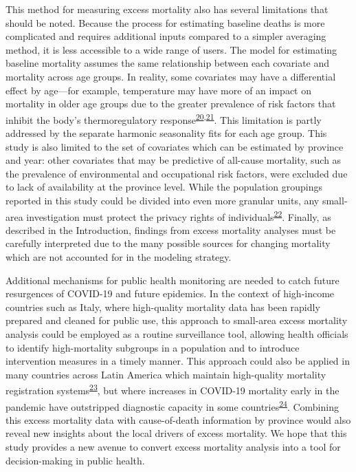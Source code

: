 \documentclass[
]{article}
\begin{document}
This method for measuring excess mortality also has several limitations that should be noted. Because the process for estimating baseline deaths is more complicated and requires additional inputs compared to a simpler averaging method, it is less accessible to a wide range of users. The model for estimating baseline mortality assumes the same relationship between each covariate and mortality across age groups. In reality, some covariates may have a differential effect by age---for example, temperature may have more of an impact on mortality in older age groups due to the greater prevalence of risk factors that inhibit the body's thermoregulatory response\textsuperscript{\protect\hyperlink{ref-Yu2010}{20},\protect\hyperlink{ref-Stafoggia2008}{21}}⁠. This limitation is partly addressed by the separate harmonic seasonality fits for each age group. This study is also limited to the set of covariates which can be estimated by province and year: other covariates that may be predictive of all-cause mortality, such as the prevalence of environmental and occupational risk factors, were excluded due to lack of availability at the province level. While the population groupings reported in this study could be divided into even more granular units, any small-area investigation must protect the privacy rights of individuals\textsuperscript{\protect\hyperlink{ref-Bayer2000}{22}}⁠. Finally, as described in the Introduction, findings from excess mortality analyses must be carefully interpreted due to the many possible sources for changing mortality which are not accounted for in the modeling strategy.

Additional mechanisms for public health monitoring are needed to catch future resurgences of COVID-19 and future epidemics. In the context of high-income countries such as Italy, where high-quality mortality data has been rapidly prepared and cleaned for public use, this approach to small-area excess mortality analysis could be employed as a routine surveillance tool, allowing health officials to identify high-mortality subgroups in a population and to introduce intervention measures in a timely manner. This approach could also be applied in many countries across Latin America which maintain high-quality mortality registration systems\textsuperscript{\protect\hyperlink{ref-Mikkelsen2015}{23}}⁠, but where increases in COVID-19 mortality early in the pandemic have outstripped diagnostic capacity in some countries\textsuperscript{\protect\hyperlink{ref-LeonCabrera2020}{24}}⁠. Combining this excess mortality data with cause-of-death information by province would also reveal new insights about the local drivers of excess mortality. We hope that this study provides a new avenue to convert excess mortality analysis into a tool for decision-making in public health.
\end{document}
